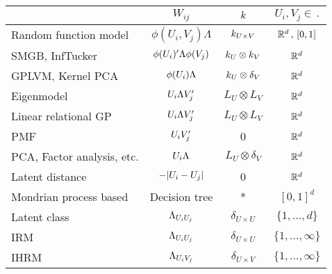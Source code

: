 \begin{table}[h]
  \centering
  \begin{tabular}{l|ccc}%
    & $W_{ij}$ & $k$ & $U_i, V_j \in \, .$ \\%
    \midrule
    Random function model & $\phi(U_i, V_j)\Lambda$ & $k_{U\times V}$ & $\mathbb{R}^d \, , \, [0,1]$\\%
    SMGB, InfTucker & $\phi(U_i)'\Lambda\phi(V_j)$ & $k_U \otimes k_V$ & $\mathbb{R}^d$\\%
    GPLVM, Kernel PCA & $\phi(U_i)\Lambda$ & $k_U \otimes \delta_V$ & $\mathbb{R}^d$ \\%
    Eigenmodel & $U_i\Lambda V_j'$ & $L_U \otimes L_V$ & $\mathbb{R}^d$ \\%
    Linear relational GP & $U_i\Lambda V_j'$ & $L_U \otimes L_V$ & $\mathbb{R}^d$ \\%
    PMF & $U_i V_j'$ & 0 & $\mathbb{R}^d$ \\%
    PCA, Factor analysis, etc. & $U_i\Lambda$ & $L_U \otimes \delta_V$ & $\mathbb{R}^d$ \\%
    Latent distance & $-|U_i - U_j|$ & 0 & $\mathbb{R}^d$ \\%
    Mondrian process based & Decision tree & * & $[0, 1]^d$ \\%
    \midrule
    Latent class & $\Lambda_{U_iU_j}$ & $\delta_{U\times U}$ & $\{1,\ldots,d\}$ \\%
    IRM &$\Lambda_{U_iU_j}$ & $\delta_{U\times U}$ & $\{1,\ldots,\infty\}$ \\%
    IHRM  &$\Lambda_{U_iV_j}$ & $\delta_{U\times V}$ & $\{1,\ldots,\infty\}$ \\%

\end{tabular}
\end{table}
